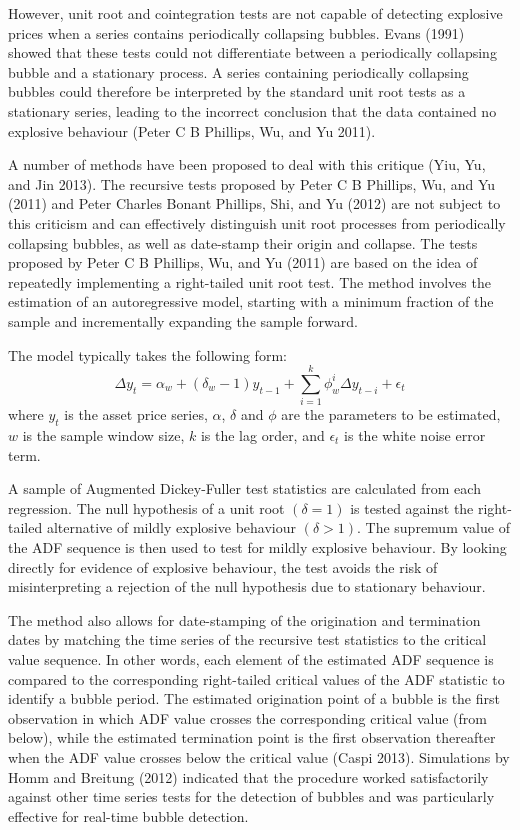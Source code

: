 \documentclass[]{elsarticle} %
\begin{document}
However, unit root and cointegration tests are not capable of detecting
explosive prices when a series contains periodically collapsing bubbles.
Evans (1991) showed that these tests could not differentiate between a
periodically collapsing bubble and a stationary process. A series
containing periodically collapsing bubbles could therefore be
interpreted by the standard unit root tests as a stationary series,
leading to the incorrect conclusion that the data contained no explosive
behaviour (Peter C B Phillips, Wu, and Yu 2011).

A number of methods have been proposed to deal with this critique (Yiu,
Yu, and Jin 2013). The recursive tests proposed by Peter C B Phillips,
Wu, and Yu (2011) and Peter Charles Bonant Phillips, Shi, and Yu (2012)
are not subject to this criticism and can effectively distinguish unit
root processes from periodically collapsing bubbles, as well as
date-stamp their origin and collapse. The tests proposed by Peter C B
Phillips, Wu, and Yu (2011) are based on the idea of repeatedly
implementing a right-tailed unit root test. The method involves the
estimation of an autoregressive model, starting with a minimum fraction
of the sample and incrementally expanding the sample forward.

The model typically takes the following form:
\[\Delta y_t = \alpha_w + (\delta_w - 1) y_{t-1} + \sum_{i=1}^k \phi_w^i \Delta y_{t-i} + \epsilon_t\]
where \(y_t\) is the asset price series, \(\alpha\), \(\delta\) and
\(\phi\) are the parameters to be estimated, \(w\) is the sample window
size, \(k\) is the lag order, and \(\epsilon_t\) is the white noise
error term.

A sample of Augmented Dickey-Fuller test statistics are calculated from
each regression. The null hypothesis of a unit root \((\delta = 1)\) is
tested against the right-tailed alternative of mildly explosive
behaviour \((\delta > 1)\). The supremum value of the ADF sequence is
then used to test for mildly explosive behaviour. By looking directly
for evidence of explosive behaviour, the test avoids the risk of
misinterpreting a rejection of the null hypothesis due to stationary
behaviour.

The method also allows for date-stamping of the origination and
termination dates by matching the time series of the recursive test
statistics to the critical value sequence. In other words, each element
of the estimated ADF sequence is compared to the corresponding
right-tailed critical values of the ADF statistic to identify a bubble
period. The estimated origination point of a bubble is the first
observation in which ADF value crosses the corresponding critical value
(from below), while the estimated termination point is the first
observation thereafter when the ADF value crosses below the critical
value (Caspi 2013). Simulations by Homm and Breitung (2012) indicated
that the procedure worked satisfactorily against other time series tests
for the detection of bubbles and was particularly effective for
real-time bubble detection.
\end{document}
